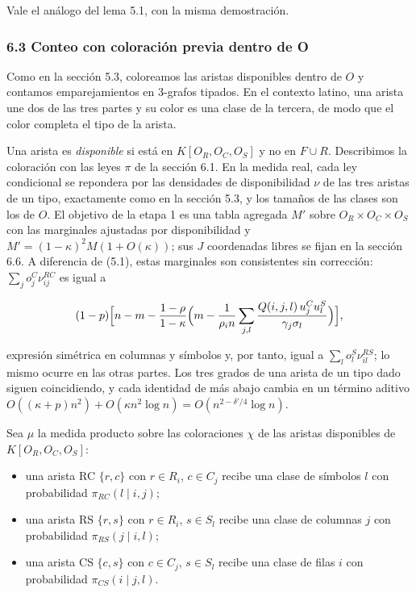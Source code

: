 \documentclass[spanish,11pt,a4paper]{article}
\providecommand{\tightlist}{\setlength{\itemsep}{0pt}\setlength{\parskip}{0pt}}
\begin{document}
Vale el análogo del lema 5.1, con la misma demostración.

\subsubsection{6.3 Conteo con coloración previa dentro de O}\label{conteo-con-coloraciuxf3n-previa-dentro-de-o-1}

Como en la sección 5.3, coloreamos las aristas disponibles dentro de \(O\) y contamos emparejamientos en 3-grafos tipados. En el contexto latino, una arista une dos de las tres partes y su color es una clase de la tercera, de modo que el color completa el tipo de la arista.

Una arista es \emph{disponible} si está en \(K[O_R,O_C,O_S]\) y no en \(F\cup R\). Describimos la coloración con las leyes \(\pi\) de la sección 6.1. En la medida real, cada ley condicional se repondera por las densidades de disponibilidad \(\nu\) de las tres aristas de un tipo, exactamente como en la sección 5.3, y los tamaños de las clases son los de \(O\). El objetivo de la etapa 1 es una tabla agregada \(M'\) sobre \(O_R\times O_C\times O_S\) con las marginales ajustadas por disponibilidad y \(M'=(1-\kappa)^2M(1+O(\kappa))\); sus \(J\) coordenadas libres se fijan en la sección 6.6. A diferencia de (5.1), estas marginales son consistentes sin corrección: \(\sum_jo^C_j\nu^{RC}_{ij}\) es igual a

\nopagebreak[4]
\[(1-p)\Bigl[n-m-\frac{1-\rho}{1-\kappa}\Bigl(m-\frac{1}{\rho_in}\sum_{j,l}\frac{Q(i,j,l)\,u^C_ju^S_l}{\gamma_j\sigma_l}\Bigr)\Bigr],\]

expresión simétrica en columnas y símbolos y, por tanto, igual a \(\sum_lo^S_l\nu^{RS}_{il}\); lo mismo ocurre en las otras partes. Los tres grados de una arista de un tipo dado siguen coincidiendo, y cada identidad de más abajo cambia en un término aditivo \(O((\kappa+p)n^2)+O(\kappa n^2\log n)=O(n^{2-\delta'/4}\log n)\).

Sea \(\mu\) la medida producto sobre las coloraciones \(\chi\) de las aristas disponibles de \(K[O_R,O_C,O_S]\):

\begin{itemize}
\tightlist
\item
  una arista RC \(\{r,c\}\) con \(r\in R_i\), \(c\in C_j\) recibe una clase de símbolos \(l\) con probabilidad \(\pi_{RC}(l\mid i,j)\);
\item
  una arista RS \(\{r,s\}\) con \(r\in R_i\), \(s\in S_l\) recibe una clase de columnas \(j\) con probabilidad \(\pi_{RS}(j\mid i,l)\);
\item
  una arista CS \(\{c,s\}\) con \(c\in C_j\), \(s\in S_l\) recibe una clase de filas \(i\) con probabilidad \(\pi_{CS}(i\mid j,l)\).
\end{itemize}
\end{document}
